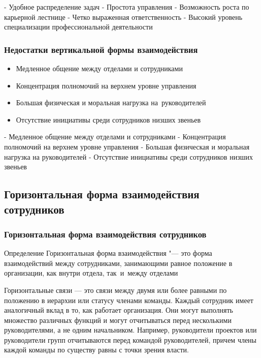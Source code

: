 \documentclass{../industrial-development}
\begin{document}
\lecturenotes
- Удобное распределение задач
- Простота управления
- Возможность роста по карьерной лестнице
- Четко выраженная ответственность
- Высокий уровень специализации профессиональной деятельности

\begin{frame} \frametitle{Недостатки вертикальной формы взаимодействия}
  
	\begin{itemize}
		\item Медленное общение между отделами и сотрудниками
		\item Концентрация полномочий на верхнем уровне управления
		\item Большая физическая и моральная нагрузка на~руководителей
		\item Отсутствие инициативы среди сотрудников низших звеньев
	\end{itemize}
\end{frame}

\lecturenotes
- Медленное общение между отделами и сотрудниками
- Концентрация полномочий на верхнем уровне управления
- Большая физическая и моральная нагрузка на руководителей
- Отсутствие инициативы среди сотрудников низших звеньев

\subsection{Горизонтальная форма взаимодействия сотрудников}

\begin{frame} \frametitle{Горизонтальная форма взаимодействия сотрудников}
	\begin{block}{Определение}
		\alert{Горизонтальная форма взаимодействия} "--- это форма взаимодействий между сотрудниками, занимающими равное положение в организации, как внутри отдела, так~и~между отделами
	\end{block}
\end{frame}

\lecturenotes
Горизонтальные связи — это связи между двумя или более равными по положению в иерархии или статусу членами команды. Каждый сотрудник имеет аналогичный вклад в то, как работает организация. Они могут выполнять множество различных функций и могут отчитываться перед несколькими руководителями, а не одним начальником. Например, руководители проектов или руководители групп отчитываются перед командой руководителей, причем члены каждой команды по существу равны с точки зрения власти.
\end{document}
